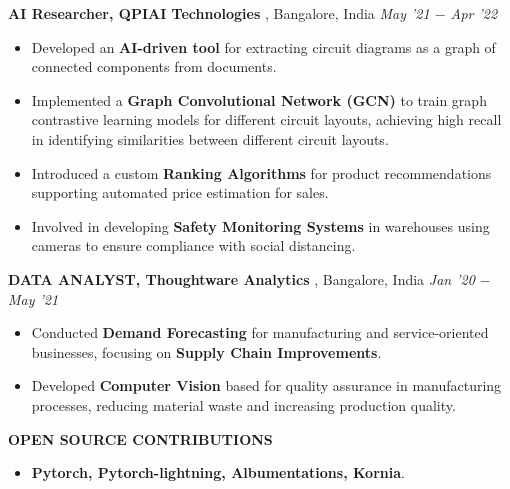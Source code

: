 \documentclass[10pt,a4]{article}
\begin{document}
{\begin{flushleft}
    \textbf{\large AI Researcher, QPIAI Technologies },  Bangalore, India \hfill \textit{\large May '21 $-$ Apr '22}	\\
    \begin{itemize}
          
        \item Developed an \textbf{AI-driven tool} for extracting circuit diagrams as a graph of connected components from documents.
        \item Implemented a \textbf{Graph Convolutional Network (GCN)} to train graph contrastive learning models for different circuit layouts, achieving high recall in identifying similarities between different circuit layouts.
        \item Introduced a custom \textbf{Ranking Algorithms} for product recommendations supporting automated price estimation for sales.
        \item Involved in developing \textbf{Safety Monitoring Systems} in warehouses using cameras to ensure compliance with social distancing.
    \end{itemize}		

    \textbf{\large DATA ANALYST, Thoughtware Analytics },  Bangalore, India \hfill \textit{\large Jan '20 $-$ May '21}	\\		
    \begin{itemize}
          
        \item Conducted \textbf{Demand Forecasting} for manufacturing and service-oriented businesses, focusing on \textbf{Supply Chain Improvements}.
        \item Developed \textbf{Computer Vision} based for quality assurance in manufacturing processes, reducing material waste and increasing production quality.   
    \end{itemize}
    
\end{flushleft}

\begin{flushleft}
    \textbf{\large OPEN SOURCE CONTRIBUTIONS}
    \begin{itemize}
        \item \textbf{Pytorch, Pytorch-lightning, Albumentations, Kornia}.
    \end{itemize}
\end{flushleft}



}
\end{document}
